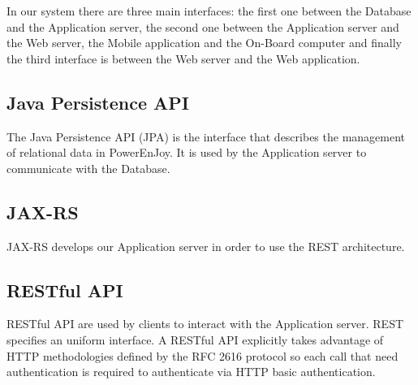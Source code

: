 In our system there are three main interfaces: the first one between the Database and the Application server, the second one between the Application server and the Web server, the Mobile application and the On-Board computer and finally the third interface is between the Web server and the Web application.

\subsection{Java Persistence API}
The Java Persistence API (JPA) is the interface that describes the management of relational data in PowerEnJoy. It is used by the Application server to communicate with the Database.
 	
\subsection{JAX-RS}
JAX-RS develops our Application server in order to use the REST architecture.

\subsection{RESTful API}
RESTful API are used by clients to interact with the Application server. REST specifies an uniform interface. A RESTful API explicitly takes advantage of HTTP methodologies defined by the RFC 2616 protocol so each call that need authentication is required to authenticate via HTTP basic authentication.
